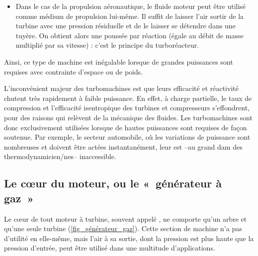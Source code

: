 		\begin{itemize}
			\item Dans le cas de la propulsion aéronautique, le fluide moteur peut être utilisé comme médium de propulsion lui-même. Il suffit de laisser l’air sortir de la turbine avec une pression résiduelle et de le laisser se détendre dans une tuyère. On obtient alors une poussée par réaction (égale au débit de masse multiplié par sa vitesse) : c’est le principe du turboréacteur.
		\end{itemize}

		Ainsi, ce type de machine est inégalable lorsque de grandes puissances sont requises avec contrainte d’espace ou de poids.

		L’inconvénient majeur des turbomachines est que leurs efficacité et réactivité chutent très rapidement à faible puissance. En effet, à charge partielle, le taux de compression et l’efficacité isentropique des turbines et compresseurs s’effondrent, pour des raisons qui relèvent de la mécanique des fluides. Les turbomachines sont donc exclusivement utilisées lorsque de hautes puissances sont requises de façon soutenue. Par exemple, le secteur automobile, où les variations de puissance sont nombreuses et doivent être actées instantanément, leur est --au grand dam des thermodynamicien/nes-- inaccessible.


	\subsection{Le cœur du moteur, ou le «~générateur à gaz~»}
	\label{ch_generateur_gaz}

		Le cœur de tout moteur à turbine, souvent appelé , ne comporte qu’un arbre et qu’une seule turbine (\cref{fig_générateur_gaz}). Cette section de machine n’a pas d’utilité en elle-même, mais l’air à sa sortie, dont la pression est plus haute que la pression d’entrée, peut être utilisé dans une multitude d’applications.


